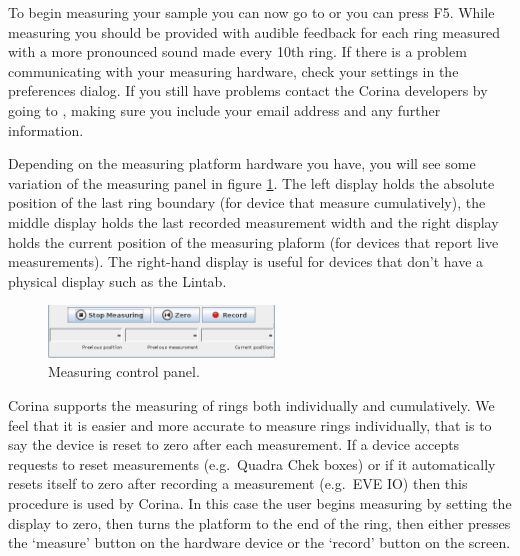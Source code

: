To begin measuring your sample you can now go to  or you can press F5. While measuring you should be provided with audible feedback for each ring measured with a more pronounced sound made every 10th ring. If there is a problem communicating with your measuring hardware, check your settings in the preferences dialog. If you still have problems contact the Corina developers by going to , making sure you include your email address and any further information.

Depending on the measuring platform hardware you have, you will see some variation of the measuring panel in figure \ref{fig:measurepanel}. The left display holds the absolute position of the last ring boundary (for device that measure cumulatively), the middle display holds the last recorded measurement width and the right display holds the current position of the measuring plaform (for devices that report live measurements).  The right-hand display is useful for devices that don't have a physical display such as the Lintab. 

\begin{figure}
  \begin{center}
    \includegraphics[width=6cm]{Images/measurepanel.png}
  \end{center}
  \caption{Measuring control panel.}
  \label{fig:measurepanel}
\end{figure}


Corina supports the measuring of rings both individually and cumulatively.  We feel that it is easier and more accurate to measure rings individually, that is to say the device is reset to zero after each measurement.  If a device accepts requests to reset measurements (e.g.\ Quadra Chek boxes) or if it automatically resets itself to zero after recording a measurement (e.g.\ EVE IO) then this procedure is used by Corina.  In this case the user begins measuring by setting the display to zero, then turns the platform to the end of the ring, then either presses the `measure' button on the hardware device or the `record' button on the screen.


